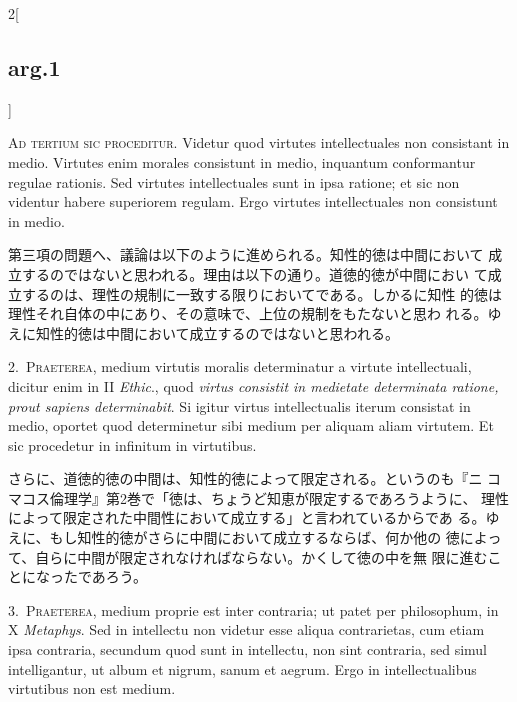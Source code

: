 \documentclass[paper=a4paper,fontsize=10pt,jafontsize=9pt,titlepage]{jlreq}
\begin{document}
\begin{paracol}{2}[\subsection{arg.1}]

{\scshape Ad tertium sic proceditur}. Videtur quod virtutes
intellectuales non consistant in medio. Virtutes enim morales
consistunt in medio, inquantum conformantur regulae rationis. Sed
virtutes intellectuales sunt in ipsa ratione; et sic non videntur
habere superiorem regulam. Ergo virtutes intellectuales non consistunt
in medio.

\switchcolumn

第三項の問題へ、議論は以下のように進められる。知性的徳は中間において
 成立するのではないと思われる。理由は以下の通り。道徳的徳が中間におい
 て成立するのは、理性の規制に一致する限りにおいてである。しかるに知性
 的徳は理性それ自体の中にあり、その意味で、上位の規制をもたないと思わ
 れる。ゆえに知性的徳は中間において成立するのではないと思われる。


2.~{\scshape Praeterea}, medium virtutis moralis determinatur a
virtute intellectuali, dicitur enim in II {\itshape Ethic}., quod
{\itshape virtus consistit in medietate determinata ratione, prout
sapiens determinabit}. Si igitur virtus intellectualis iterum
consistat in medio, oportet quod determinetur sibi medium per aliquam
aliam virtutem. Et sic procedetur in infinitum in virtutibus.

\switchcolumn

さらに、道徳的徳の中間は、知性的徳によって限定される。というのも『ニ
 コマコス倫理学』第2巻で「徳は、ちょうど知恵が限定するであろうように、
 理性によって限定された中間性において成立する」と言われているからであ
 る。ゆえに、もし知性的徳がさらに中間において成立するならば、何か他の
 徳によって、自らに中間が限定されなければならない。かくして徳の中を無
 限に進むことになったであろう。


3.~{\scshape Praeterea}, medium proprie est inter contraria; ut patet
per philosophum, in X {\itshape Metaphys}. Sed in intellectu non
videtur esse aliqua contrarietas, cum etiam ipsa contraria, secundum
quod sunt in intellectu, non sint contraria, sed simul intelligantur,
ut album et nigrum, sanum et aegrum. Ergo in intellectualibus
virtutibus non est medium.


\end{paracol}
\end{document}
